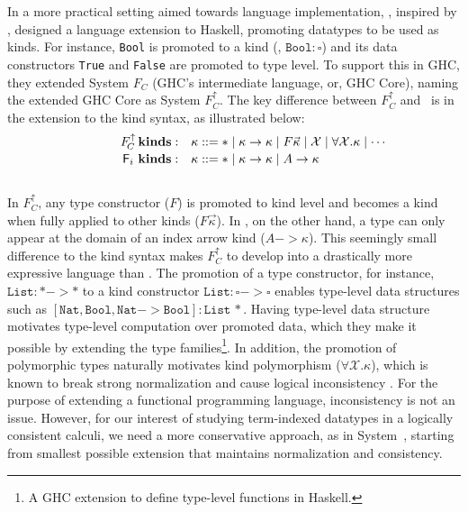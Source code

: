 In a more practical setting aimed towards language implementation,
\citet{YorgeyWCJVM12}, inspired by \citet{SHE}, designed a language extension
to Haskell, promoting datatypes to be used as kinds. For instance, \texttt{Bool}
is promoted to a kind (\ie, $\texttt{Bool}:\square$) and its data constructors
\texttt{True} and \texttt{False} are promoted to type level. To support this
in GHC, they extended System $F_{\!C}$ (GHC's intermediate language, or,
GHC Core), naming the extended GHC Core as System $F_{\!C}^\uparrow$.
The key difference between $F_{\!C}^\uparrow$ and \Fi\ is in the extension
to the kind syntax, as illustrated below: \vspace*{-2pt}
\[\qquad\quad
\begin{array}{ll}
F_{\!C}^\uparrow\,\textbf{kinds}: &
\kappa ::= * \mid \kappa -> \kappa \mid F \vec{\kappa} \mid \mathcal{X} \mid \forall \mathcal{X}.\kappa \mid \cdots \\
\,\Fi\,\,\textbf{kinds}: &
\kappa ::= * \mid \kappa -> \kappa \mid A -> \kappa \phantom{A^{A^A}}
\end{array}  
\] ~\vspace*{-6pt}\\
In $F_{\!C}^\uparrow$, any type constructor ($F$) is promoted to 
kind level and becomes a kind when fully applied to other kinds
($F\vec\kappa$). In \Fi, on the other hand, a type can only appear
at the domain of an index arrow kind ($A-> \kappa$). This seemingly small
difference to the kind syntax makes $F_{\!C}^\uparrow$ to develop into
a drastically more expressive language than \Fi. The promotion of
a type constructor, for instance, $\texttt{List}:* -> *$ to a kind constructor
$\texttt{List}:\square-> \square$ enables type-level data structures
such as $\mathtt{[Nat,Bool,Nat-> Bool]:List\,*}$. Having type-level
data structure motivates type-level computation over promoted data,
which they make it possible by extending the type families\footnote{
	A GHC extension to define type-level functions in Haskell.}.
In addition, the promotion of polymorphic types naturally motivates
kind polymorphism ($\forall \mathcal{X}.\kappa$), which is known to
break strong normalization and cause logical inconsistency \cite{Girard72}.
For the purpose of extending a functional programming language,
inconsistency is not an issue. However, for our interest of studying
term-indexed datatypes in a logically consistent calculi, we need
a more conservative approach, as in System~\Fi, starting from smallest possible
extension that maintains normalization and consistency.

